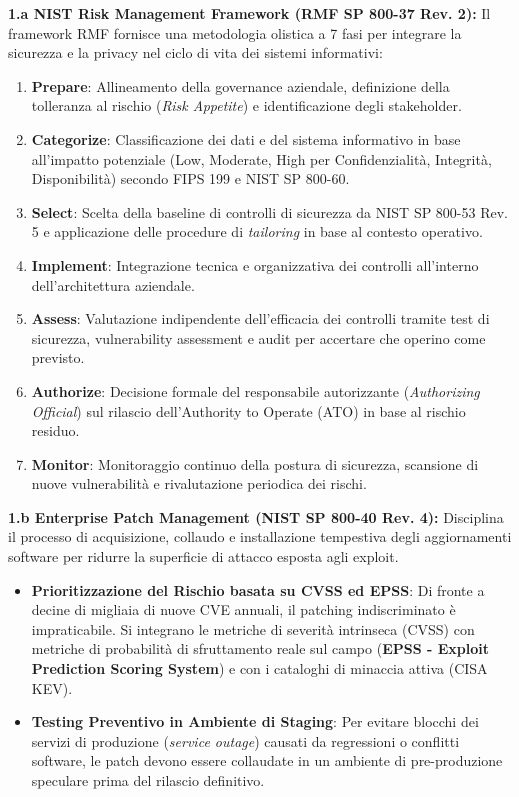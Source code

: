 \documentclass[11pt,a4paper]{article}
\begin{document}
\begin{solutionbox}
\textbf{1.a NIST Risk Management Framework (RMF SP 800-37 Rev. 2):}
Il framework RMF fornisce una metodologia olistica a 7 fasi per integrare la sicurezza e la privacy nel ciclo di vita dei sistemi informativi:
\begin{enumerate}
    \item \textbf{Prepare}: Allineamento della governance aziendale, definizione della tolleranza al rischio (\textit{Risk Appetite}) e identificazione degli stakeholder.
    \item \textbf{Categorize}: Classificazione dei dati e del sistema informativo in base all'impatto potenziale (Low, Moderate, High per Confidenzialit\`a, Integrit\`a, Disponibilit\`a) secondo FIPS 199 e NIST SP 800-60.
    \item \textbf{Select}: Scelta della baseline di controlli di sicurezza da NIST SP 800-53 Rev. 5 e applicazione delle procedure di \textit{tailoring} in base al contesto operativo.
    \item \textbf{Implement}: Integrazione tecnica e organizzativa dei controlli all'interno dell'architettura aziendale.
    \item \textbf{Assess}: Valutazione indipendente dell'efficacia dei controlli tramite test di sicurezza, vulnerability assessment e audit per accertare che operino come previsto.
    \item \textbf{Authorize}: Decisione formale del responsabile autorizzante (\textit{Authorizing Official}) sul rilascio dell'Authority to Operate (ATO) in base al rischio residuo.
    \item \textbf{Monitor}: Monitoraggio continuo della postura di sicurezza, scansione di nuove vulnerabilit\`a e rivalutazione periodica dei rischi.
\end{enumerate}

\textbf{1.b Enterprise Patch Management (NIST SP 800-40 Rev. 4):}
Disciplina il processo di acquisizione, collaudo e installazione tempestiva degli aggiornamenti software per ridurre la superficie di attacco esposta agli exploit.
\begin{itemize}
    \item \textbf{Prioritizzazione del Rischio basata su CVSS ed EPSS}: Di fronte a decine di migliaia di nuove CVE annuali, il patching indiscriminato \`e impraticabile. Si integrano le metriche di severit\`a intrinseca (CVSS) con metriche di probabilit\`a di sfruttamento reale sul campo (\textbf{EPSS - Exploit Prediction Scoring System}) e con i cataloghi di minaccia attiva (CISA KEV).
    \item \textbf{Testing Preventivo in Ambiente di Staging}: Per evitare blocchi dei servizi di produzione (\textit{service outage}) causati da regressioni o conflitti software, le patch devono essere collaudate in un ambiente di pre-produzione speculare prima del rilascio definitivo.
\end{itemize}


\end{solutionbox}
\end{document}
